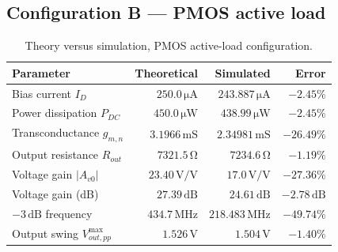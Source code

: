 \documentclass[12pt,a4paper]{article}
\newcommand{\U}[1]{\,\mathrm{#1}}
\begin{document}
\subsection{Configuration B --- PMOS active load}
\begin{table}[H]
\centering
\caption{Theory versus simulation, PMOS active-load configuration.}
\label{tab:tvsB}
\begin{tabular}{lrrr}
\toprule
\textbf{Parameter} & \textbf{Theoretical} & \textbf{Simulated} & \textbf{Error} \\
\midrule
Bias current $I_D$            & $250.0\U{\mu A}$   & $243.887\U{\mu A}$ & $-2.45\%$ \\
Power dissipation $P_{DC}$    & $450.0\U{\mu W}$   & $438.99\U{\mu W}$  & $-2.45\%$ \\
Transconductance $g_{m,n}$    & $3.1966\U{mS}$     & $2.34981\U{mS}$    & $-26.49\%$ \\
Output resistance $R_{out}$   & $7321.5\U{\Omega}$ & $7234.6\U{\Omega}$ & $-1.19\%$ \\
Voltage gain $|A_{v0}|$       & $23.40\U{V/V}$     & $17.0\U{V/V}$      & $-27.36\%$ \\
Voltage gain (dB)             & $27.39\U{dB}$      & $24.61\U{dB}$      & $-2.78\U{dB}$ \\
$-3\U{dB}$ frequency          & $434.7\U{MHz}$     & $218.483\U{MHz}$   & $-49.74\%$ \\
Output swing $V_{out,pp}^{\max}$ & $1.526\U{V}$    & $1.504\U{V}$       & $-1.40\%$ \\
\bottomrule
\end{tabular}
\end{table}
\end{document}
